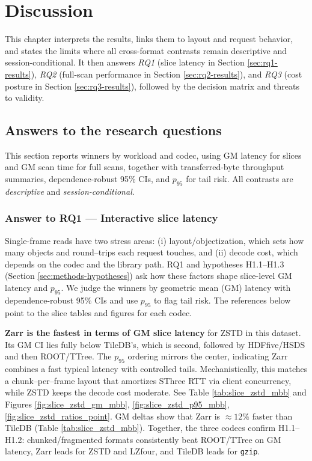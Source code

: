 \documentclass[nomenclature, english, bibtex]{kththesis}
\numberwithin{listing}{chapter}
\begin{document}
\cleardoublepage
\chapter{Discussion}
\label{ch:discussion}
This chapter interprets the results, links them to layout and request behavior, and states the limits where all cross-format contrasts remain descriptive and session-conditional. It then answers \emph{RQ1} (slice latency in Section \ref{sec:rq1-results}), \emph{RQ2} (full-scan performance in Section \ref{sec:rq2-results}), and \emph{RQ3} (cost posture in Section \ref{sec:rq3-results}), followed by the decision matrix and threats to validity.

\section{Answers to the research questions}
\label{sec:discussion-bottomline}
This section reports winners by workload and codec, using \gls{GM} latency for slices and \gls{GM} scan time for full scans, together with transferred-byte throughput summaries, dependence-robust 95\% \glspl{CI}, and $p_{95}$ for tail risk. All contrasts are \emph{descriptive} and \emph{session-conditional}.

\subsection{Answer to RQ1 — Interactive slice latency}
\label{sec:ans-rq1}
Single-frame reads have two stress areas: (i) layout/objectization, which sets how many objects and round–trips each request touches, and (ii) decode cost, which depends on the codec and the library path. RQ1 and hypotheses H1.1–H1.3 (Section \ref{sec:methods-hypotheses}) ask how these factors shape slice-level \gls{GM} latency and $p_{95}$. We judge the winners by geometric mean (\gls{GM}) latency with dependence-robust 95\% \glspl{CI} and use $p_{95}$ to flag tail risk. The references below point to the slice tables and figures for each codec.

\textbf{Zarr is the fastest in terms of \gls{GM} slice latency} for \gls{ZSTD} in this dataset. Its \gls{GM} \gls{CI} lies fully below TileDB’s, which is second, followed by \gls{HDFfive}/\gls{HSDS} and then \gls{ROOT}/\gls{TTree}. The $p_{95}$ ordering mirrors the center, indicating Zarr combines a fast typical latency with controlled tails. Mechanistically, this matches a chunk–per–frame layout that amortizes \gls{SThree} RTT via client concurrency, while \gls{ZSTD} keeps the decode cost moderate. See Table \ref{tab:slice_zstd_mbb} and Figures \ref{fig:slice_zstd_gm_mbb}, \ref{fig:slice_zstd_p95_mbb}, \ref{fig:slice_zstd_ratios_point}. \gls{GM} deltas show that Zarr is $\approx 12\%$ faster than TileDB (Table \ref{tab:slice_zstd_mbb}). Together, the three codecs confirm H1.1–H1.2: chunked/fragmented formats consistently beat \gls{ROOT}/\gls{TTree} on \gls{GM} latency, Zarr leads for \gls{ZSTD} and \gls{LZfour}, and TileDB leads for \texttt{gzip}.
\end{document}
